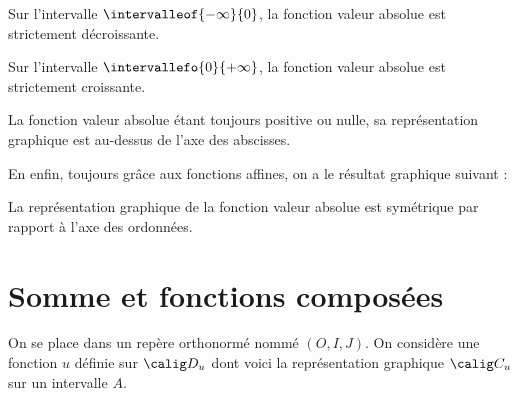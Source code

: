 \documentclass[10pt,openright,twoside,french]{book}
\begin{document}
\begin{Prop}
    Sur l'intervalle $\intervalleof{-\infty}{0}$, la fonction valeur absolue est strictement décroissante.\par
    Sur l'intervalle $\intervallefo{0}{+\infty}$, la fonction valeur absolue est strictement croissante.
\end{Prop}

\begin{center}
\end{center}

\begin{Rmq}
    La fonction valeur absolue étant toujours positive ou nulle, sa représentation graphique est au-dessus de l'axe des abscisses.
\end{Rmq}\medskip

En enfin, toujours grâce aux fonctions affines, on a le résultat graphique suivant :

\begin{Prop}
    La représentation graphique de la fonction valeur absolue est symétrique par rapport à l'axe des ordonnées.
\end{Prop}

\section{Somme et fonctions composées}
On se place dans un repère orthonormé nommé $(O, I, J)$. On considère une fonction $u$ définie sur $\calig D_u$ dont voici la représentation graphique $\calig C_u$ sur un intervalle $A$.

\begin{center}
\end{center}
\end{document}
